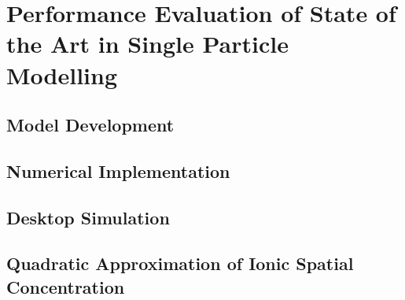

\graphicspath{{chapters/spm_analysis/figures/}}

\clearpage
\chapter{Performance Evaluation of State of the Art in Single Particle Modelling}\label{ch:spmanalysis}
\startcontents[chapters]

\bigskip


% 

\section{ Model Development}\label{sec:spmmodeldevelopment}



\section{Numerical Implementation}\label{sec:numericalimplementation}


\section{Desktop Simulation}\label{sec:basicspmsimresults}




\section{Quadratic Approximation of Ionic Spatial Concentration}\label{sec:quadraticapprox}


